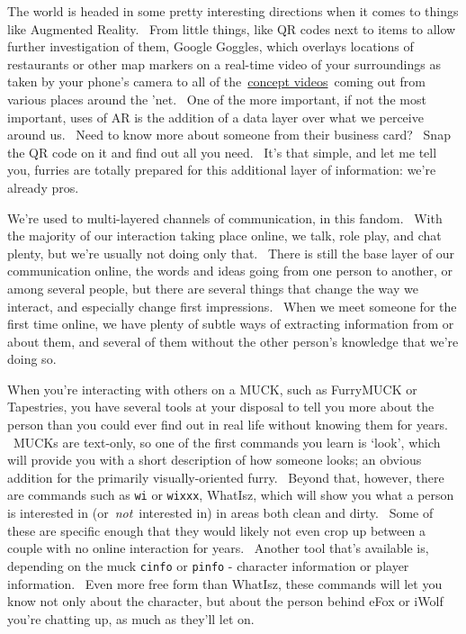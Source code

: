 The world is headed in some pretty interesting directions when it comes
to things like Augmented Reality. ~From little things, like QR codes
next to items to allow further investigation of them, Google Goggles,
which overlays locations of restaurants or other map markers on a
real-time video of your surroundings as taken by your phone's camera to
all of
the~\href{http://vimeo.com/search/videos/search:augmented\%20reality/st/27d7a185}{concept
videos}~coming out from various places around the 'net. ~One of the more
important, if not the most important, uses of AR is the addition of a
data layer over what we perceive around us. ~Need to know more about
someone from their business card? ~Snap the QR code on it and find out
all you need. ~It's that simple, and let me tell you, furries are
totally prepared for this additional layer of information: we're already
pros.

We're used to multi-layered channels of communication, in this fandom.
~With the majority of our interaction taking place online, we talk, role
play, and chat plenty, but we're usually not doing only that. ~There is
still the base layer of our communication online, the words and ideas
going from one person to another, or among several people, but there are
several things that change the way we interact, and especially change
first impressions. ~When we meet someone for the first time online, we
have plenty of subtle ways of extracting information from or about them,
and several of them without the other person's knowledge that we're
doing so.

When you're interacting with others on a MUCK, such as FurryMUCK or
Tapestries, you have several tools at your disposal to tell you more
about the person than you could ever find out in real life without
knowing them for years. ~MUCKs are text-only, so one of the first
commands you learn is `look', which will provide you with a short
description of how someone looks; an obvious addition for the primarily
visually-oriented furry. ~Beyond that, however, there are commands such
as \texttt{wi} or \texttt{wixxx}, WhatIsz, which will show you what a
person is interested in (or~\emph{not}~interested in) in areas both
clean and dirty. ~Some of these are specific enough that they would
likely not even crop up between a couple with no online interaction for
years. ~Another tool that's available is, depending on the muck
\texttt{cinfo} or \texttt{pinfo} - character information or player
information. ~Even more free form than WhatIsz, these commands will let
you know not only about the character, but about the person behind eFox
or iWolf you're chatting up, as much as they'll let on.

